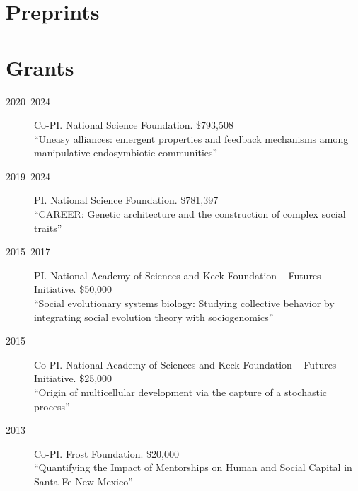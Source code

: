 \documentclass[11pt]{article}
\begin{document}
  \begin{publist}
    
    
    
  \end{publist}
  
  \section{Preprints}
  
  \begin{publist}

  \item {}
    
  \item {}
        
  \item {}
    
  \end{publist}
  
  \section{Grants}
  \begin{description}
  \item[2020--2024] Co-PI. National Science Foundation. \$793,508\\
    ``Uneasy alliances: emergent properties and feedback mechanisms among manipulative endosymbiotic communities''
  \item[2019--2024] PI. National Science Foundation. \$781,397\\
    ``CAREER: Genetic architecture and the construction of complex social traits''
  \item[2015--2017] PI. National Academy of Sciences and Keck Foundation -- Futures Initiative. \$50,000\\
    ``Social evolutionary systems biology: Studying collective behavior by integrating social evolution theory with sociogenomics''
  \item[2015] Co-PI. National Academy of Sciences and Keck Foundation -- Futures Initiative. \$25,000\\
    ``Origin of multicellular development via the capture of a stochastic process''
  \item[2013] Co-PI. Frost Foundation. \$20,000 \\
    ``Quantifying the Impact of Mentorships on Human and Social Capital in Santa Fe New Mexico''
  \end{description}
  
\end{document}
